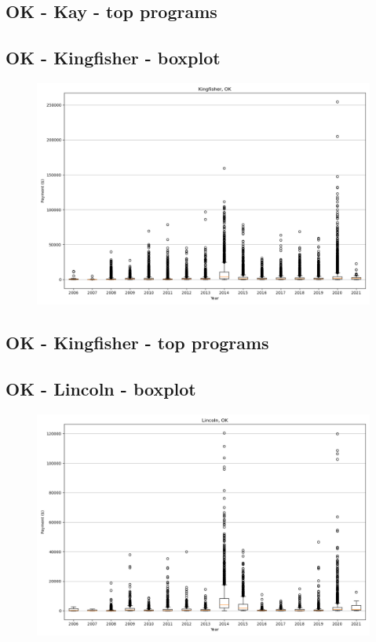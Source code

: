 \subsection*{OK - Kay - top programs}

\newpage
\subsection*{OK - Kingfisher - boxplot}
\begin{figure}[h]
\centering
\includegraphics[width=7in]{../output/boxplots/counties/Kingfisher-OK_boxplot.png}
\end{figure}


\subsection*{OK - Kingfisher - top programs}

\newpage
\subsection*{OK - Lincoln - boxplot}
\begin{figure}[h]
\centering
\includegraphics[width=7in]{../output/boxplots/counties/Lincoln-OK_boxplot.png}
\end{figure}


